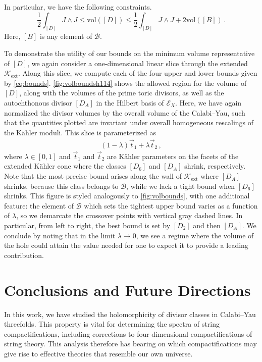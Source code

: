 \documentclass[11pt,dvipsnames]{article}
\theoremstyle{definition}
\begin{document}
In particular, we have the following constraints.
\begin{equation}
    \label{eq:bounds}
    \frac{1}{2}\int_{[D]} J \wedge J \leq \text{vol}([D]) \leq \frac{1}{2}\int_{[D]} J \wedge J + 2 \text{vol}([B])\,.
\end{equation}
Here, $[B]$ is any element of $\mathcal{B}$.

To demonstrate the utility of our bounds on the minimum volume representative of $[D]$, we again consider a one-dimensional linear slice through the extended $\mathcal{K}_{\text{ext}}$. Along this slice, we compute each of the four upper and lower bounds given by \cref{eq:bounds}. \cref{fig:volboundsh114} shows the allowed region for the volume of $[D]$, along with the volumes of the prime toric divisors, as well as the autochthonous divisor $[D_A]$ in the Hilbert basis of $\mathcal{E}_X$. Here, we have again normalized the divisor volumes by the overall volume of the Calabi--Yau, such that the quantities plotted are invariant under overall homogeneous rescalings of the K\"ahler moduli. This slice is parameterized as
\begin{align}\label{eq:h11=4 line param}
    (1-\lambda) \vec{t}_1 + \lambda \vec{t}_2\,,
\end{align}
where $\lambda \in [0,1]$ and $\vec{t}_1$ and $\vec{t}_2$ are K\"ahler parameters on the facets of the extended K\"ahler cone where the classes $[D_6]$ and $[D_A]$ shrink, respectively. Note that the most precise bound arises along the wall of $\mathcal{K}_{\text{ext}}$ where $[D_A]$ shrinks, because this class belongs to $\mathcal{B}$, while we lack a tight bound when $[D_6]$ shrinks. This figure is styled analogously to \cref{fig:volbounds}, with one additional feature: the element of $\mathcal{B}$ which sets the tightest upper bound varies as a function of $\lambda$, so we demarcate the crossover points with vertical gray dashed lines. In particular, from left to right, the best bound is set by $[D_2]$ and then $[D_A]$. We conclude by noting that in the limit $\lambda \to 0$, we see a regime where the volume of the hole could attain the value needed for one to expect it to provide a leading contribution.

\section{Conclusions and Future Directions} \label{sec:conclusions}

In this work, we have studied the holomorphicity of divisor classes in Calabi--Yau threefolds. This property is vital for determining the spectra of string compactifications, including corrections to four-dimensional compactifications of string theory. This analysis therefore has bearing on which compactifications may give rise to effective theories that resemble our own universe.
\end{document}
